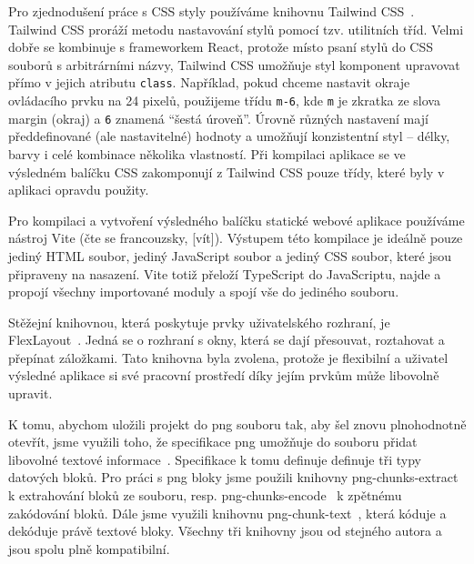Pro zjednodušení práce s CSS styly používáme knihovnu Tailwind CSS~\cite{tailwindlabs_tailwindcss_2020}.
Tailwind CSS proráží metodu nastavování stylů pomocí tzv. utilitních tříd.
Velmi dobře se kombinuje s frameworkem React, protože místo psaní stylů do CSS souborů s arbitrárními názvy, Tailwind CSS umožňuje styl komponent upravovat přímo v jejich atributu \texttt{class}.
Například, pokud chceme nastavit okraje ovládacího prvku na 24 pixelů, použijeme třídu \texttt{m-6}, kde \texttt{m} je zkratka ze slova margin (okraj) a \texttt{6} znamená \enquote{šestá úroveň}.
Úrovně různých nastavení mají předdefinované (ale nastavitelné) hodnoty a umožňují konzistentní styl -- délky, barvy i celé kombinace několika vlastností.
Při kompilaci aplikace se ve výsledném balíčku CSS zakomponují z Tailwind CSS pouze třídy, které byly v aplikaci opravdu použity.

Pro kompilaci a vytvoření výsledného balíčku statické webové aplikace používáme nástroj Vite (čte se francouzsky, [vít]).
Výstupem této kompilace je ideálně pouze jediný HTML soubor, jediný JavaScript soubor a jediný CSS soubor, které jsou připraveny na nasazení.
Vite totiž přeloží TypeScript do JavaScriptu, najde a propojí všechny importované moduly a spojí vše do jediného souboru.

Stěžejní knihovnou, která poskytuje prvky uživatelského rozhraní, je FlexLayout~\cite{_flexlayout_2015}.
Jedná se o rozhraní s okny, která se dají přesouvat, roztahovat a přepínat záložkami.
Tato knihovna byla zvolena, protože je flexibilní a uživatel výsledné aplikace si své pracovní prostředí díky jejím prvkům může libovolně upravit.

K tomu, abychom uložili projekt do \acrshort{png} souboru tak, aby šel znovu plnohodnotně otevřít, jsme využili toho, že specifikace \acrshort{png} umožňuje do souboru přidat libovolné textové informace~\cite[sekce 11.3.4]{w3c_portablenetwork_2003}.
Specifikace k tomu definuje definuje tři typy datových bloků.
Pro práci s \acrshort{png} bloky jsme použili knihovny png-chunks-extract~\cite{kennedy_pngchunksextract_2015} k extrahování bloků ze souboru, resp. png-chunks-encode~\cite{kennedy_pngchunksencode_2015} k zpětnému zakódování bloků.
Dále jsme využili knihovnu png-chunk-text~\cite{kennedy_pngchunktext_2015}, která kóduje a dekóduje právě textové bloky.
Všechny tři knihovny jsou od stejného autora a jsou spolu plně kompatibilní.

